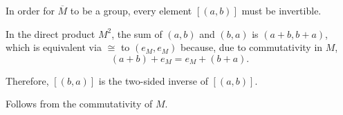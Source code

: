 \begin{defproof}
   In order for \( \overline M \) to be a group, every element \( [(a, b)] \) must be invertible.

  In the direct product \( M^2 \), the sum of \( (a, b) \) and \( (b, a) \) is \( (a + b, b + a) \), which is equivalent via \( {\cong} \) to \( (e_M, e_M) \) because, due to commutativity in \( M \),
  \begin{equation*}
    (a + b) + e_M = e_M + (b + a).
  \end{equation*}

  Therefore, \( [(b, a)] \) is the two-sided inverse of \( [(a, b)] \).

   Follows from the commutativity of \( M \).
\end{defproof}

